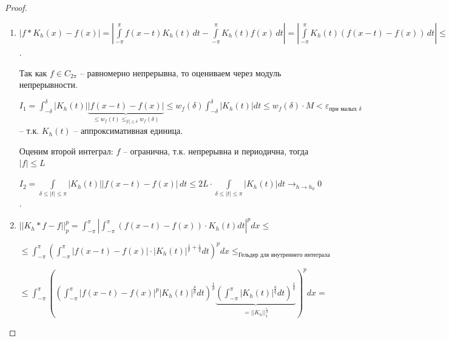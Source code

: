 \begin{proof}
    \begin{enumerate}
        \item {
            $|f * K_h (x) - f(x)| = |\int\limits_{-\pi}^\pi f(x - t) K_h (t) \, dt - \int\limits_{-\pi}^\pi K_h (t) f(x) \, dt| = |\int\limits_{-\pi}^\pi K_h (t) (f(x - t) - f(x)) \, dt | \leqslant \int\limits_{-\pi}^\pi |K_h (t)| |f(x - t) - f(x)| \, dt = \int\limits_{-\delta}^\delta + \int\limits_{\delta \leqslant |t| \leqslant \pi} = I_1 + I_2$.

            Так как $f \in C_{2\pi}$ -- равномерно непрерывна, то оцениваем через модуль непрерывности.
            
            $I_1 = \int_{-\delta}^{\delta} |K_h(t)| \underbrace{|f(x-t) - f(x)|}_{\leq w_f(t) \leq_{|t| \leq \delta} w_f(\delta)} \leq w_f(\delta) \int_{-\delta}^{\delta} |K_h(t)| dt \leq w_f(\delta) \cdot M < \varepsilon_{\text{при малых } \delta}$ -- т.к. $K_h(t)$ -- аппроксимативная единица.

            Оценим второй интеграл: $f$ -- огранична, т.к. непрерывна и периодична, тогда $|f| \leq L$

            $I_2 = \int\limits_{\delta \leqslant |t| \leqslant \pi} |K_h (t)| |f(x - t) - f(x)| \, dt \leq 2 L \cdot \int\limits_{\delta \leqslant |t| \leqslant \pi} |K_h(t)| dt \to_{h \to h_0} 0$.



        }
        \item {
            $|| K_h * f - f ||_p^p = \int_{-\pi}^{\pi} \left| \int_{-\pi}^{\pi} \left( f(x-t) - f(x) \right) \cdot K_h(t) dt \right|^p dx \leq$
            
            $\leq \int_{-\pi}^{\pi} \left( \int_{-\pi}^{\pi} \left| f(x-t) - f(x) \right| \cdot |K_h(t)|^{\frac{1}{p} + \frac{1}{q}} dt \right)^p dx \leq_{\text{Гельдер для внутреннего интеграла}}$

            $\leq \int_{-\pi}^{\pi} \left( \left( \int_{-\pi}^{\pi} |f(x-t) - f(x)|^p |K_h(t)|^{\frac{p}{p}} dt \right)^{\frac{1}{p}} \underbrace{\left( \int_{-\pi}^{\pi} |K_h(t)|^{\frac{q}{q}} dt \right)^{\frac{1}{q}}}_{= || K_h ||_1^{\frac{1}{q}}} \right)^p dx = $

}
\end{enumerate}
\end{proof}
